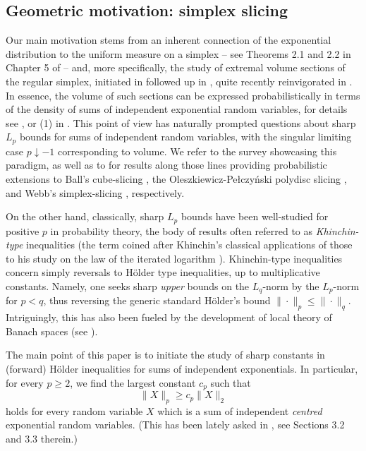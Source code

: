 \documentclass[10pt]{article}
\newcommand{\1}{\textbf{1}}
\theoremstyle{remark}
\theoremstyle{definition}
\begin{document}
\subsection{Geometric motivation: simplex slicing}
Our main motivation stems from an inherent connection of the exponential distribution to the uniform measure on a simplex -- see Theorems 2.1 and 2.2 in Chapter 5 of \cite{Luc} -- and, more specifically, the study of extremal volume sections of the regular simplex, initiated in \cite{Webb} followed up in \cite{Brz}, quite recently reinvigorated in \cite{MRTT, MTTT}. In essence, the volume of such sections can be expressed probabilistically in terms of the density of sums of independent exponential random variables, for details see \cite{Webb}, or (1) in \cite{MRTT}. This point of view has naturally prompted questions about sharp $L_p$ bounds for sums of independent random variables, with the singular limiting case $p \downarrow -1$ corresponding to volume. We refer to the survey \cite{NT-surv} showcasing this paradigm, as well as to \cite{CKT, CST, MRTT} for results along those lines providing probabilistic extensions to Ball's cube-slicing \cite{Ball-cube}, the Oleszkiewicz-Pe\l czy\'nski polydisc slicing \cite{OP}, and Webb's simplex-slicing \cite{Webb}, respectively. 

On the other hand, classically, sharp $L_p$ bounds have been well-studied for positive $p$ in probability theory, the body of results often referred to as \emph{Khinchin-type} inequalities (the term coined after Khinchin's classical applications of those to his study on the law of the iterated logarithm \cite{Khi}). Khinchin-type inequalities concern simply reversals to H\"older type inequalities, up to multiplicative constants. Namely, one seeks sharp \emph{upper} bounds on the $L_q$-norm by the $L_p$-norm for $p < q$, thus reversing the generic standard H\"older's bound $\|\cdot\|_p \leq \|\cdot\|_q$. Intriguingly, this has also been fueled  by the development of local theory of Banach spaces (see \cite{HNVW, KST, LT}). 

The main point of this paper is to initiate the study of sharp constants in (forward) H\"older inequalities for sums of independent exponentials. In particular, for every $p \geq 2$, we find the largest constant $c_p$ such that
\begin{equation}\label{eq:Lp-L2-intro}
\|X\|_p \geq c_p\|X\|_2
 \end{equation}
holds for every random variable $X$ which is a sum of independent \emph{centred} exponential random variables. (This has been lately asked in \cite{MRTT}, see Sections 3.2 and 3.3 therein.)
\end{document}

